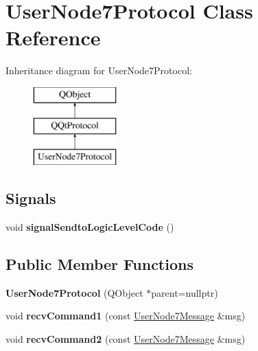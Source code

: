 \hypertarget{class_user_node7_protocol}{}\section{User\+Node7\+Protocol Class Reference}
\label{class_user_node7_protocol}
Inheritance diagram for User\+Node7\+Protocol\+:\begin{figure}[H]
\begin{center}
\leavevmode
\includegraphics[height=3.000000cm]{class_user_node7_protocol}
\end{center}
\end{figure}
\subsection*{Signals}
\begin{DoxyCompactItemize}
\item 
\mbox{\label{class_user_node7_protocol_a2377d6091de8a032cd280397f5826569}} 
void {\bfseries signal\+Sendto\+Logic\+Level\+Code} ()
\end{DoxyCompactItemize}
\subsection*{Public Member Functions}
\begin{DoxyCompactItemize}
\item 
\mbox{\label{class_user_node7_protocol_a1283e68365df4bc6f6dfdd3cc7de5288}} 
{\bfseries User\+Node7\+Protocol} (Q\+Object $\ast$parent=nullptr)
\item 
\mbox{\label{class_user_node7_protocol_a952bd889498e37ea1881f7e7f9638859}} 
void {\bfseries recv\+Command1} (const \mbox{\hyperlink{class_user_node7_message}{User\+Node7\+Message}} \&msg)
\item 
\mbox{\label{class_user_node7_protocol_ac1f9375f98536edb2a0cd0b773de33ab}} 
void {\bfseries recv\+Command2} (const \mbox{\hyperlink{class_user_node7_message}{User\+Node7\+Message}} \&msg)
\end{DoxyCompactItemize}

